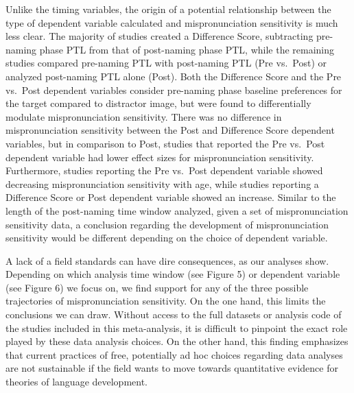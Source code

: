 \documentclass[man]{apa6}
\theoremstyle{definition}
\theoremstyle{definition}
\theoremstyle{definition}
\theoremstyle{remark}
\begin{document}
Unlike the timing variables, the origin of a potential relationship
between the type of dependent variable calculated and mispronunciation
sensitivity is much less clear. The majority of studies created a
Difference Score, subtracting pre-naming phase PTL from that of
post-naming phase PTL, while the remaining studies compared pre-naming
PTL with post-naming PTL (Pre vs.~Post) or analyzed post-naming PTL
alone (Post). Both the Difference Score and the Pre vs.~Post dependent
variables consider pre-naming phase baseline preferences for the target
compared to distractor image, but were found to differentially modulate
mispronunciation sensitivity. There was no difference in
mispronunciation sensitivity between the Post and Difference Score
dependent variables, but in comparison to Post, studies that reported
the Pre vs.~Post dependent variable had lower effect sizes for
mispronunciation sensitivity. Furthermore, studies reporting the Pre
vs.~Post dependent variable showed decreasing mispronunciation
sensitivity with age, while studies reporting a Difference Score or Post
dependent variable showed an increase. Similar to the length of the
post-naming time window analyzed, given a set of mispronunciation
sensitivity data, a conclusion regarding the development of
mispronunciation sensitivity would be different depending on the choice
of dependent variable.

A lack of a field standards can have dire consequences, as our analyses
show. Depending on which analysis time window (see Figure 5) or
dependent variable (see Figure 6) we focus on, we find support for any
of the three possible trajectories of mispronunciation sensitivity. On
the one hand, this limits the conclusions we can draw. Without access to
the full datasets or analysis code of the studies included in this
meta-analysis, it is difficult to pinpoint the exact role played by
these data analysis choices. On the other hand, this finding emphasizes
that current practices of free, potentially ad hoc choices regarding
data analyses are not sustainable if the field wants to move towards
quantitative evidence for theories of language development.
\end{document}
